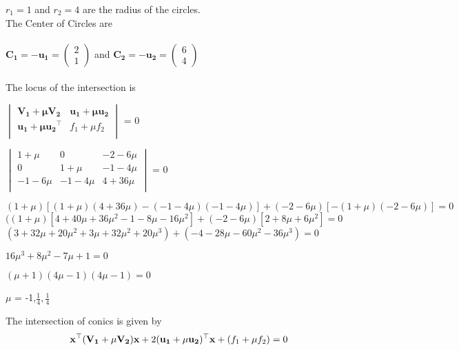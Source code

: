 \documentclass[journal,12pt,twocolumn]{IEEEtran}
\newcommand{\myvec}[1]{\ensuremath{\begin{pmatrix}#1\end{pmatrix}}}
\let\vec\mathbf
\begin{document}
$r_1=1$ and $r_2=4$ are the radius of the circles.
\vspace{0.2cm}
\\
The Center of Circles are \\
\\
$\vec{C_1=-u_1} = \myvec{2\\1}$ and $\vec{C_2=-u_2} = \myvec{6\\4}$\\
\\
The locus of the intersection is 
\\
\begin{center}
$\begin{vmatrix}
\vec{V_1+\mu V_2} & \vec{u_1+\mu u_2} \\ 
\vec{u_1+\mu u_2}^\top & f_1+\mu f_2 \\
\end{vmatrix}$ = 0
\end{center}

\begin{center}
$\begin{vmatrix}
{1+\mu} & 0 & {-2-6\mu} \\ 
0 & {1+\mu} & {-1-4\mu} \\
{-1-6\mu} & {-1-4\mu} & {4+36\mu} \\
\end{vmatrix}$ = 0
\end{center} 
\vspace{0.1cm}
${(1+\mu)}[(1+\mu)(4+36\mu)-(-1-4\mu)(-1-4\mu)]+(-2-6\mu)[-(1+\mu)(-2-6\mu)]=0$ \\

$((1+\mu)[4+40\mu+36\mu^2-1-8\mu-16\mu^2]+(-2-6\mu)[2+8\mu+6\mu^2] = 0$ \\

$(3+32\mu+20\mu^2+3\mu+32\mu^2+20\mu^3)+(-4-28\mu-60\mu^2-36\mu^3) = 0$ 

\begin{center}
$16\mu^3+8\mu^2-7\mu+1 = 0$ \\
\end{center}

\hspace*{1.2cm}$(\mu+1)(4\mu-1)(4\mu-1) = 0$
\begin{center}
$\mu$ = -1,$\frac{1}{4},\frac{1}{4}$\\
\end{center}

The intersection of conics is given by
\begin{equation}
{\vec{x^{\top}{(V_1+\mu V_2)}x}+2\vec{(u_1+\mu u_2)^{\top}x}+(f_1+\mu f_2)}=0\\
\end{equation}
\end{document}
